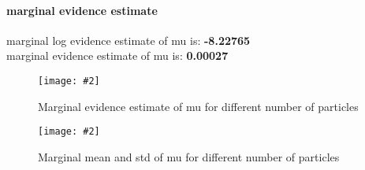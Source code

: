 \documentclass{article}
\newcommand{\centerfigcap}[3]{\begin{figure}[H]
\begin{center}\texttt{[image: \#2]} \caption{#3}\end{center}
\end{figure}}
\begin{document}
\paragraph{marginal evidence estimate}
marginal log evidence estimate of mu is: \textbf{-8.22765}\\
marginal evidence estimate of mu is: \textbf{0.00027}\\

\begin{minipage}{.5\textwidth}
  \centering
\centerfigcap{1}{../Figures/Evidence_4}{Marginal evidence estimate of mu for different number of particles}
\end{minipage}%
\begin{minipage}{.5\textwidth}
  \centering
\centerfigcap{1}{../Figures/Mean-Std_4}{Marginal mean and std of mu for different number of particles}
\end{minipage}
\end{document}
